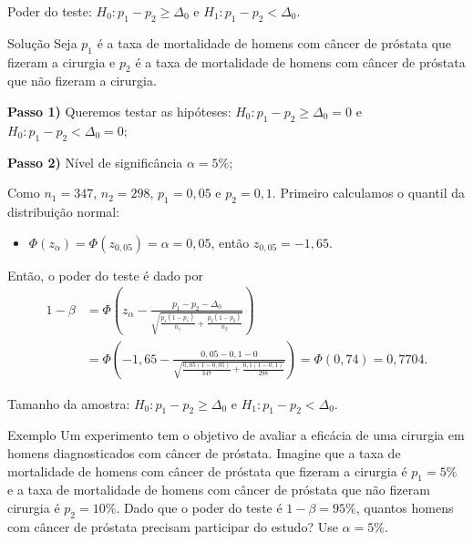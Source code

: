 \documentclass[9pt]{beamer}
\begin{document}
\begin{frame}{Poder do teste: $H_0:p_1 - p_2 \geq \Delta_0$ e $H_1: p_1 - p_2 < \Delta_0$.}

\begin{block}{Solução}
	Seja $p_1$ é a taxa de mortalidade de homens com câncer de próstata que fizeram a cirurgia e $p_2$ é a taxa de mortalidade de homens com câncer de próstata que não fizeram a cirurgia.
	
	\textbf{Passo 1)} Queremos testar as hipóteses: $H_0: p_1 - p_2 \geq \Delta_0=0$ e $H_0: p_1 - p_2 < \Delta_0=0$;
	
	\textbf{Passo 2)} Nível de significância $\alpha=5\%$;
	
	Como $n_1=347$, $n_2=298$, $p_1=0,05$ e $p_2=0,1$. Primeiro calculamos o quantil da distribuição normal:
	\begin{itemize}
		\item $\Phi\left(z_{\alpha}\right) = \Phi\left(z_{0,05}\right) = \alpha = 0,05$, então $z_{0,05} = -1,65$.
	\end{itemize}
	Então, o poder do teste é dado por
	\begin{align*}
	1-\beta &= \Phi\left( z_{\alpha} - \frac{p_1-p_2 - \Delta_0}{\sqrt{\frac{p_1(1-p_1)}{n_1} + \frac{p_2(1-p_2)}{n_2}}} \right)\\
	&= \Phi \left( -1,65 - \frac{0,05 - 0,1 - 0}{ \sqrt{\frac{0,05(1-0,05)}{347} + \frac{0,1(1-0,1)}{298}}}  \right)= \Phi \left( 0,74 \right) = 0,7704.
	\end{align*}
\end{block}

\end{frame}

\begin{frame}{Tamanho da amostra: $H_0:p_1 - p_2 \geq \Delta_0$ e $H_1: p_1 - p_2 < \Delta_0$.}
\begin{block}{Exemplo}
	Um experimento tem o objetivo de avaliar a eficácia de uma cirurgia em homens diagnosticados com câncer de próstata. 
	Imagine que a taxa de mortalidade de homens com câncer de próstata que fizeram a cirurgia é $p_1=5\%$ e a taxa de mortalidade de homens com câncer de próstata que não fizeram cirurgia é $p_2=10\%$. Dado que o poder do teste é $1-\beta=95\%$,  quantos homens com câncer de próstata precisam participar do estudo? Use $\alpha=5\%$.
\end{block}
\end{frame}
\end{document}
